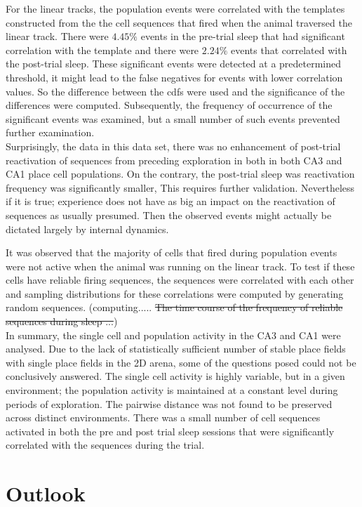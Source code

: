 For the linear tracks, the population events were correlated with the templates constructed from the the cell sequences that fired when the animal traversed the linear track. There were $4.45 \% $ events in the pre-trial sleep that had significant correlation with the template and there were $ 2.24 \% $  events that correlated with the post-trial sleep. These significant events were detected at a predetermined threshold, it might lead to the false negatives for events with lower correlation values. So the difference between the cdfs were used and the significance of the differences were computed. Subsequently, the frequency of occurrence of the significant events was examined, but a small number of such events prevented further examination.\\ Surprisingly, the data in this data set, there was no enhancement of post-trial reactivation of sequences from preceding exploration in both in both CA3 and CA1 place cell populations. On the contrary, the post-trial sleep was reactivation frequency was significantly smaller, This requires further validation. Nevertheless if it is true; experience does not have as big an impact on the reactivation of sequences as usually presumed. Then the observed events might actually be dictated largely by internal dynamics. 

It was observed that the majority of cells that fired during population events were not active when the animal was running on the linear track. To test if these cells have reliable firing sequences, the sequences were correlated with each other and sampling distributions for these correlations were computed by generating random sequences. (computing..... \st{The time course of the frequency of reliable sequences during sleep ...})\\

In summary, the single cell and population activity in the CA3 and CA1 were analysed. Due to the lack of statistically sufficient number of stable place fields with single place fields in the 2D arena, some of the questions posed could not be conclusively answered. The single cell activity is highly variable, but in a given environment; the population activity is maintained at a constant level during periods of exploration. The pairwise distance was not found to be preserved across distinct environments.  There was a small number of cell sequences activated in both the pre and post trial sleep sessions that were significantly correlated with the sequences during the trial. 

\section*{Outlook}




